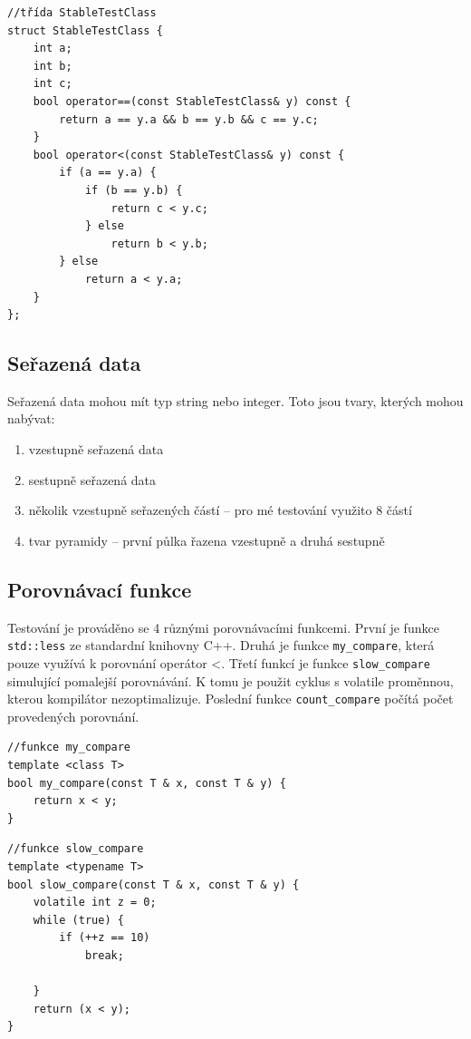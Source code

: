 \documentclass[thesis=B,czech]{FITthesis}[2019/12/23]
\begin{document}
\begin{verbatim}
//třída StableTestClass
struct StableTestClass {
    int a;
    int b;
    int c;
    bool operator==(const StableTestClass& y) const {
        return a == y.a && b == y.b && c == y.c;
    }
    bool operator<(const StableTestClass& y) const {
        if (a == y.a) {
            if (b == y.b) {
                return c < y.c;
            } else
                return b < y.b;
        } else
            return a < y.a;
    }
};
\end{verbatim}

\subsection{Seřazená data}

Seřazená data mohou mít typ string nebo integer. Toto jsou tvary, kterých mohou nabývat:
\begin{enumerate}
	\item vzestupně seřazená data
	\item sestupně seřazená data
	\item několik vzestupně seřazených částí -- pro mé testování využito 8 částí
	\item tvar pyramidy -- první půlka řazena vzestupně a druhá sestupně
\end{enumerate}


\subsection{Porovnávací funkce}

Testování je prováděno se 4 různými porovnávacími funkcemi. První je funkce \texttt{std::less} ze standardní knihovny C++. Druhá je funkce \texttt{my\_compare}, která pouze využívá k porovnání operátor <. Třetí funkcí je funkce \texttt{slow\_compare} simulující pomalejší porovnávání. K tomu je použit cyklus s volatile proměnnou, kterou kompilátor nezoptimalizuje. Poslední funkce \texttt{count\_compare} počítá počet provedených porovnání.

\begin{verbatim}
//funkce my_compare
template <class T>
bool my_compare(const T & x, const T & y) {
    return x < y;
}
\end{verbatim}

\begin{verbatim}
//funkce slow_compare
template <typename T>
bool slow_compare(const T & x, const T & y) {
    volatile int z = 0;
    while (true) {
        if (++z == 10)
            break;

    }
    return (x < y);
}
\end{verbatim}
\end{document}
